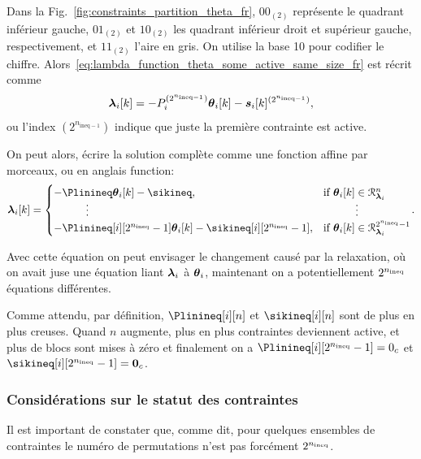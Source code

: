 \documentclass[../main.tex]{subfiles}
\begin{document}
Dans la Fig.~\ref{fig:constraints_partition_theta_fr}, ${00}_{(2)}$ représente le quadrant inférieur gauche, ${01}_{(2)}$ et ${10}_{(2)}$ les quadrant inférieur droit et supérieur gauche, respectivement, et ${11}_{(2)}$ l'aire en gris.
On utilise la base 10 pour codifier le chiffre.
Alors~\eqref{eq:lambda_function_theta_some_active_same_size_fr} est récrit comme
\begin{equation}
  \label{eq:lambda_function_theta_same_size_coded}
  \lambdaik=-\Plin^{(2^{n_{\text{ineq}-1}})}\thetaik-\sik^{(2^{n_{\text{ineq}-1}})},
\end{equation}
ou l'index $(2^{n_{\text{ineq}-1}})$ indique que juste la première contrainte est active.

On peut alors, écrire la solution complète comme une fonction affine par morceaux, ou en anglais
\pwa{} function:
\begin{equation}
  \label{eq:lambdafuntheta_fr}
  \begin{aligned}
    \lambdaik=
    \begin{cases}
      -\Plinineq\thetaik-\sikineq,&\text{if}\ \thetaik \in\set{R}_{\lambdai}^{n}\\
      \qquad\quad \vdots&\qquad\quad \vdots\\
      -\Plinineq[i][2^{\nineq}-1]\thetaik-\sikineq[i][2^{\nineq}-1],&\text{if}\ \thetaik \in\set{R}_{\lambdai}^{2^{\nineq}-1}\\
    \end{cases}
  \end{aligned}.
\end{equation}

Avec cette équation on peut envisager le changement causé par la relaxation, où on avait juse une équation liant $\boldsymbol{\lambda}_{i}$ à $\boldsymbol{\theta}_{i}$, maintenant on a potentiellement $2^{n_{\text{ineq}}}$ équations différentes.

\begin{remark}\label{rem:sparse_solutions_fr}
  Comme attendu, par définition, $\Plinineq[i][n]$ et $\sikineq[i][n]$ sont de plus en plus creuses.
  Quand $n$ augmente, plus en plus contraintes deviennent active, et plus de blocs sont mises à zéro et finalement on a $\Plinineq[i][2^{\nineq}-1]=0_{c}$ et $\sikineq[i][2^{\nineq}-1]=\0_{c}$.
\end{remark}

\subsubsection{Considérations sur le statut des contraintes}\label{sec:cons-about-stat_fr}
Il est important de constater que, comme dit, pour quelques ensembles de contraintes le numéro de permutations n'est pas forcément $2^{n_{\text{ineq}}}$.
\end{document}
